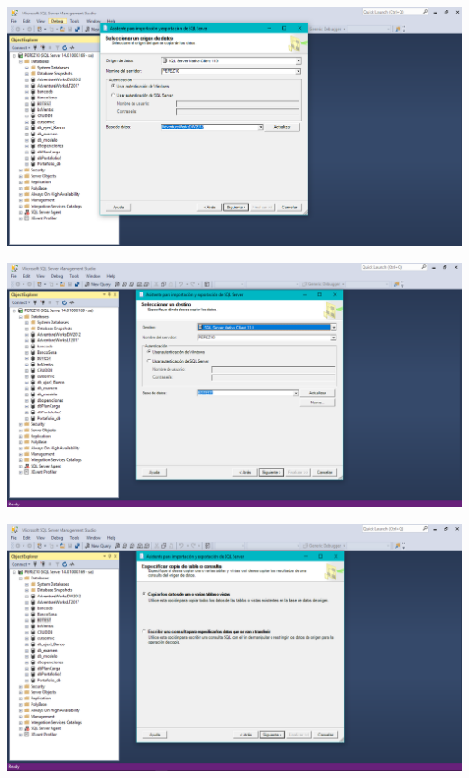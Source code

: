 {\begin{center}
\end{center}
\begin{center}
\includegraphics[width=15cm]{./Imagenes/imagen4}
\end{center}
\begin{center}
\includegraphics[width=15cm]{./Imagenes/imagen5}
\end{center}
\begin{center}
\includegraphics[width=15cm]{./Imagenes/imagen6}
\end{center}
\begin{center}

\end{center}}
